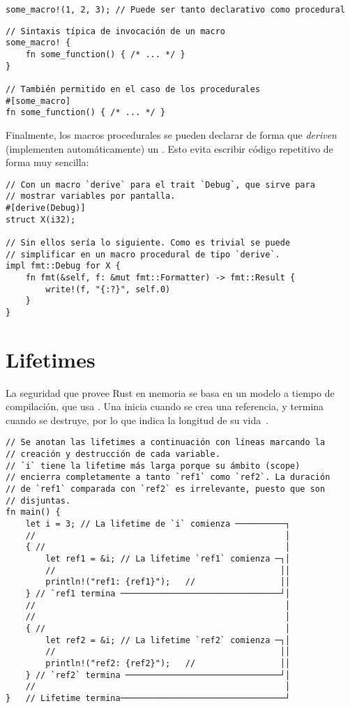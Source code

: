 \begin{verbatim}
some_macro!(1, 2, 3); // Puede ser tanto declarativo como procedural
\end{verbatim}

\begin{verbatim}
// Sintaxis típica de invocación de un macro
some_macro! {
    fn some_function() { /* ... */ }
}

// También permitido en el caso de los procedurales
#[some_macro]
fn some_function() { /* ... */ }
\end{verbatim}

Finalmente, los macros procedurales se pueden declarar de forma que
\emph{deriven} (implementen automáticamente) un \trait. Esto evita escribir
código repetitivo de forma muy sencilla:

\begin{verbatim}
// Con un macro `derive` para el trait `Debug`, que sirve para
// mostrar variables por pantalla.
#[derive(Debug)]
struct X(i32);

// Sin ellos sería lo siguiente. Como es trivial se puede
// simplificar en un macro procedural de tipo `derive`.
impl fmt::Debug for X {
    fn fmt(&self, f: &mut fmt::Formatter) -> fmt::Result {
        write!(f, "{:?}", self.0)
    }
}
\end{verbatim}

\section{Lifetimes}

La seguridad que provee Rust en memoria se basa en un modelo a tiempo de
compilación, que usa \lifetimes. Una \lifetime inicia cuando se crea una
referencia, y termina cuando se destruye, por lo que indica la longitud de su
vida~\cite[Lifetimes]{rustexample}.

\begin{verbatim}
// Se anotan las lifetimes a continuación con líneas marcando la
// creación y destrucción de cada variable.
// `i` tiene la lifetime más larga porque su ámbito (scope)
// encierra completamente a tanto `ref1` como `ref2`. La duración
// de `ref1` comparada con `ref2` es irrelevante, puesto que son
// disjuntas.
fn main() {
    let i = 3; // La lifetime de `i` comienza ──────────┐
    //                                                  │
    { //                                                │
        let ref1 = &i; // La lifetime `ref1` comienza ─┐│
        //                                             ││
        println!("ref1: {ref1}");   //                 ││
    } // `ref1 termina ────────────────────────────────┘│
    //                                                  │
    //                                                  │
    { //                                                │
        let ref2 = &i; // La lifetime `ref2` comienza ─┐│
        //                                             ││
        println!("ref2: {ref2}");   //                 ││
    } // `ref2` termina ───────────────────────────────┘│
    //                                                  │
}   // Lifetime termina─────────────────────────────────┘
\end{verbatim}

